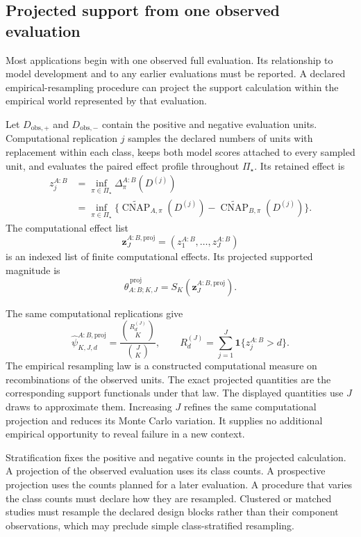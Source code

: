 \documentclass[11pt]{article}
\newcommand{\CNAP}{\operatorname{CNAP}}
\newcommand{\PSet}{\Pi_\star}
\newcommand{\CNAPta}{\widetilde{\CNAP}}
\theoremstyle{remark}
\begin{document}
\subsection{Projected support from one observed evaluation}

Most applications begin with one observed full evaluation. Its relationship to model development and to any earlier evaluations must be reported. A declared empirical-resampling procedure can project the support calculation within the empirical world represented by that evaluation.

Let $D_{\mathrm{obs},+}$ and $D_{\mathrm{obs},-}$ contain the positive and negative evaluation units. Computational replication $j$ samples the declared numbers of units with replacement within each class, keeps both model scores attached to every sampled unit, and evaluates the paired effect profile throughout $\PSet$. Its retained effect is
\[
\begin{aligned}
z_j^{A:B}
&=
\inf_{\pi\in\PSet}\Delta^{A:B}_\pi(D^{(j)}) \\
&=
\inf_{\pi\in\PSet}
\{\CNAPta_{A,\pi}(D^{(j)})-\CNAPta_{B,\pi}(D^{(j)})\}.
\end{aligned}
\]
The computational effect list
\[
\mathbf z_J^{A:B,\mathrm{proj}}
=
(z_1^{A:B},\ldots,z_J^{A:B})
\]
is an indexed list of finite computational effects. Its projected supported
magnitude is
\[
\widehat\theta_{A:B;K,J}^{\,\mathrm{proj}}
=
S_K\!\left(\mathbf z_J^{A:B,\mathrm{proj}}\right).
\]

The same computational replications give
\begin{equation}
\widehat\psi_{K,J,d}^{A:B,\mathrm{proj}}
=
\frac{\binom{R_d^{(J)}}{K}}{\binom{J}{K}},
\qquad
R_d^{(J)}=\sum_{j=1}^J\mathbf 1\{z_j^{A:B}>d\}.
\label{eq:projected-literal-survival}
\end{equation}
The empirical resampling law is a constructed computational measure on
recombinations of the observed units. The exact projected quantities are the
corresponding support functionals under that law. The displayed quantities use
$J$ draws to approximate them. Increasing $J$ refines the same computational
projection and reduces its Monte Carlo variation. It supplies no additional
empirical opportunity to reveal failure in a new context.

Stratification fixes the positive and negative counts in the projected calculation. A projection of the observed evaluation uses its class counts. A prospective projection uses the counts planned for a later evaluation. A procedure that varies the class counts must declare how they are resampled. Clustered or matched studies must resample the declared design blocks rather than their component observations, which may preclude simple class-stratified resampling.
\end{document}
